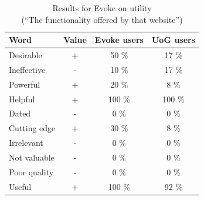 
\begin{table}[htbp]
\begin{minipage}{.7\textwidth}
    \begin{tabular}{p{1in}ccc}
    \toprule
        \textbf{Word} & \textbf{Value} & \textbf{Evoke users} & \textbf{UoG users} \\ 
    \midrule
        Desirable & + & 50 \% & 17 \% \\
        Ineffective & - & 10 \% & 17 \% \\
        Powerful & + & 20 \% & 8 \% \\
        Helpful & + & 100 \% & 100 \% \\
        Dated & - & 0 \% & 0 \% \\
        Cutting edge & + & 30 \% & 8 \% \\
        Irrelevant & - & 0 \% & 0 \% \\
        Not valuable & - & 0 \% & 0 \% \\
        Poor quality & - & 0 \% & 0 \% \\
        Useful & + & 100 \% & 92 \% \\
    \midrule
    \end{tabular}
    \caption[]{\label{table:Stolk2021x:eval:Evoke-utility}Results for Evoke on utility\\(``The functionality offered by that website'')}
\end{minipage}
\begin{minipage}{.25\textwidth}
  
\end{minipage}
\end{table}


